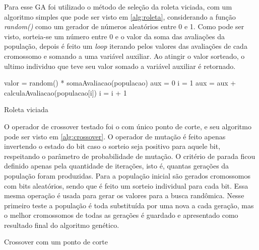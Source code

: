 Para esse GA foi utilizado o método de seleção da roleta viciada, com um algoritmo simples que pode ser visto em \autoref{alg:roleta}, considerando a função \textit{random()} como um gerador de números aleatórios entre 0 e 1. Como pode ser visto, sorteia-se um número entre 0 e o valor da soma das avaliações da população, depois é feito um \textit{loop} iterando pelos valores das avaliações de cada cromossomo e somando a uma variável auxiliar. Ao atingir o valor sorteado, o ultimo individuo que teve seu valor somado a variável auxiliar é retornado.

\begin{algorithm}
	\LinesNumbered
	valor = random() * somaAvaliacao(populacao)\;
	aux = 0\;
	i = 1\;
	 {
			aux = aux + calculaAvaliacao(populacao[i])\;
			i = i + 1\;
	}
	\caption{Roleta viciada}
	\label{alg:roleta}
\end{algorithm}

O operador de crossover testado foi o com único ponto de corte, e seu algoritmo pode ser visto em \autoref{alg:crossover}. O operador de mutação é feito apenas invertendo o estado do bit caso o sorteio seja positivo para aquele bit, respeitando o parâmetro de probabilidade de mutação. O critério de parada ficou definido apenas pela quantidade de iterações, isto é, quantas gerações da população foram produzidas. Para a população inicial são gerados cromossomos com bits aleatórios, sendo que é feito um sorteio individual para cada bit. Essa mesma operação é usada para gerar os valores para a busca randômica. Nesse primeiro teste a população é toda substituída por uma nova a cada geração, mas o melhor cromossomos de todas as gerações é guardado e apresentado como resultado final do algoritmo genético.

\begin{algorithm}
	\LinesNumbered
	\caption{Crossover com um ponto de corte}
	\label{alg:crossover}
\end{algorithm}

